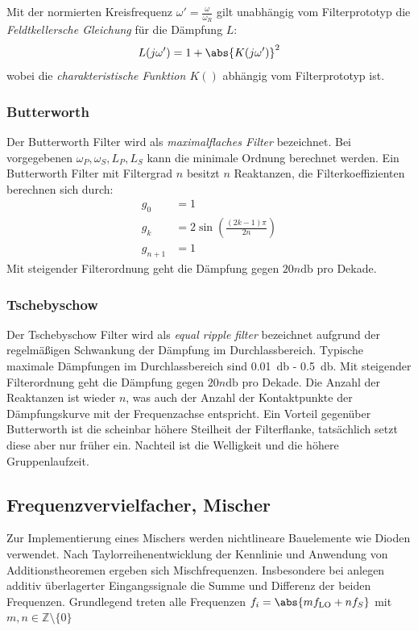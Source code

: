 Mit der normierten Kreisfrequenz $\omega' = \frac{\omega}{\omega_R}$ gilt unabhängig vom
Filterprototyp die \emph{Feldtkellersche Gleichung} für die Dämpfung $L$:
\begin{equation}
    L(j\omega') = 1 + \abs{K(j\omega')}^2
\end{equation}
wobei die \emph{charakteristische Funktion $K()$} abhängig vom Filterprototyp ist.

\subsubsection{Butterworth}
Der Butterworth Filter wird als \emph{maximalflaches Filter} bezeichnet.
Bei vorgegebenen $\omega_P, \omega_S, L_P, L_S$ kann die minimale Ordnung berechnet werden.
Ein Butterworth Filter mit Filtergrad $n$ besitzt $n$ Reaktanzen, die Filterkoeffizienten berechnen
sich durch:
\begin{align}
    g_0 &= 1\\
    g_k &= 2 \sin\left( \frac{(2k-1)\pi}{2n} \right)\\
    g_{n+1} &= 1
\end{align}
Mit steigender Filterordnung geht die Dämpfung gegen $20n\si{\decibel}$ pro Dekade.

\subsubsection{Tschebyschow}
Der Tschebyschow Filter wird als \emph{equal ripple filter} bezeichnet aufgrund der regelmäßigen
Schwankung der Dämpfung im Durchlassbereich. Typische maximale Dämpfungen im Durchlassbereich
sind \SI{0.01}{\decibel} - \SI{0.5}{\decibel}.
Mit steigender Filterordnung geht die Dämpfung gegen $20n\si{\decibel}$ pro Dekade.
Die Anzahl der Reaktanzen ist wieder $n$, was auch der Anzahl der Kontaktpunkte der Dämpfungskurve
mit der Frequenzachse entspricht.
Ein Vorteil gegenüber Butterworth ist die scheinbar höhere Steilheit der Filterflanke, tatsächlich
setzt diese aber nur früher ein. Nachteil ist die Welligkeit und die höhere Gruppenlaufzeit.



\subsection{Frequenzvervielfacher, Mischer}
Zur Implementierung eines Mischers werden nichtlineare Bauelemente wie Dioden verwendet.
Nach Taylorreihenentwicklung der Kennlinie und Anwendung von Additionstheoremen ergeben sich
Mischfrequenzen. Insbesondere bei anlegen additiv überlagerter Eingangssignale die Summe und Differenz
der beiden Frequenzen. Grundlegend treten alle Frequenzen
$f_i = \abs{mf_\text{LO}+nf_S}$ mit $m,n\in\mathbb{Z}\setminus\{0\}$
